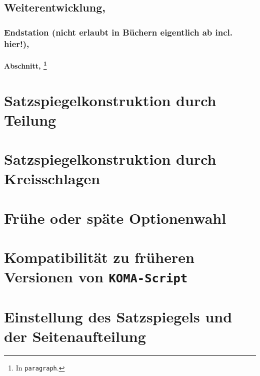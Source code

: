 \subsection[Weiterentwicklung]{Weiterentwicklung\texorpdfstring{, \protect\mbox{\footnotemark}}{}}%
\label{subsec:Einfuehrung:Satzspiegelberechnung:Grundlagen:Weiterentwicklung}%
\subsubsection[Endstation\texorpdfstring{ (nicht erlaubt in Büchern eigentlich ab incl. hier!)}{}]{Endstation\texorpdfstring{ (nicht erlaubt in Büchern eigentlich ab incl. hier!)}{}\texorpdfstring{, \protect\footnotemark}{}}%
\label{subsubsec:Einfuehrung:Satzspiegelberechnung:Grundlagen:Weiterentwicklung:Endstation}%
\paragraph[Abschnitt]{Abschnitt\texorpdfstring{, \protect\footnote{In \texttt{paragraph}.}}{}}%
\label{para:Einfuehrung:Satzspiegelberechnung:Grundlagen:Weiterentwicklung:Endstation:Abschnitt}%
\lipsum[1-1]%
\section{Satzspiegelkonstruktion durch Teilung}%
\label{sec:Einfuehrung:Satzspiegelberechnung:Satzspiegelkonstruktion Teilung}%
\lipsum[1-1]
\section{Satzspiegelkonstruktion durch Kreisschlagen}
\label{sec:Einfuehrung:Satzspiegelberechnung:Satzspiegelkonstruktion Kreisschlagen}
\lipsum[1-1]
\section{Frühe oder späte Optionenwahl}
\label{sec:Einfuehrung:Satzspiegelberechnung:Optionenwahl}
\lipsum[1-1]
\section{Kompatibilität zu früheren Versionen von \texttt{KOMA-Script}}
\label{sec:Einfuehrung:Satzspiegelberechnung:Kompatibilitaet}
\lipsum[1-1]
\section{Einstellung des Satzspiegels und der Seitenaufteilung}
\label{sec:Einfuehrung:Satzspiegelberechnung:Einstellung Satzspiegel}
\lipsum[1-1]
